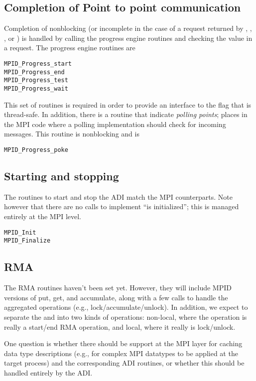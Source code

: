 \subsection{Completion of Point to point communication}
Completion of nonblocking (or incomplete in the case of a request
returned by , , , or
) is handled by calling the progress engine routines
and checking the  value in a request.  The progress engine
routines are
\begin{verbatim}
MPID_Progress_start
MPID_Progress_end
MPID_Progress_test
MPID_Progress_wait
\end{verbatim}
This set of routines is required in order to provide an
interface to the  flag that is thread-safe.
In addition, there is a routine that indicate \emph{polling points};
places in the MPI code where a polling implementation should check for
incoming messages.  This routine is nonblocking and is 
\begin{verbatim}
MPID_Progress_poke
\end{verbatim}

\subsection{Starting and stopping}
The routines to start and stop the ADI match the MPI counterparts.
Note however that there are no calls to implement ``is initialized'';
this is managed entirely at the MPI level.
\begin{verbatim}
MPID_Init
MPID_Finalize
\end{verbatim}

\subsection{RMA}
The RMA routines haven't been set yet.  However, they will include
MPID versions of put, get, and accumulate, along with a few calls to
handle the aggregated operations (e.g., lock/accumulate/unlock).
In addition, we expect to separate the  and
 into two kinds of operations: non-local, where
the operation is really a start/end RMA operation, and local, where it
really is lock/unlock.

One question is whether there should be support at the MPI layer for
caching data type descriptions (e.g., for complex MPI datatypes to be
applied at the target process) and the corresponding ADI routines, or
whether this should be handled entirely by the ADI.

